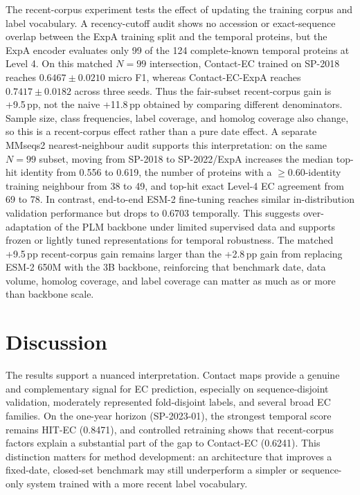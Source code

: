 \documentclass[numbered,contemporary,mediumone]{oup-authoring-template}
\begin{document}
The recent-corpus experiment tests the effect of updating the training corpus and
label vocabulary. A recency-cutoff audit shows no accession or exact-sequence
overlap between the ExpA training split and the temporal proteins, but the ExpA
encoder evaluates only 99 of the 124 complete-known temporal proteins at Level 4.
On this matched $N=99$ intersection, Contact-EC trained on SP-2018 reaches
$0.6467\pm0.0210$ micro F1, whereas Contact-EC-ExpA reaches
$0.7417\pm0.0182$ across three seeds. Thus the fair-subset recent-corpus gain is
+9.5\,pp, not the naive +11.8\,pp obtained by
comparing different denominators. Sample size, class frequencies, label
coverage, and homolog coverage also change, so this is a recent-corpus effect
rather than a pure date effect. A separate MMseqs2 nearest-neighbour audit
supports this interpretation: on the same $N=99$ subset, moving from SP-2018 to
SP-2022/ExpA increases the median top-hit identity from 0.556 to 0.619, the
number of proteins with a $\geq0.60$-identity training neighbour from 38 to 49,
and top-hit exact Level-4 EC agreement from 69 to 78. In contrast,
end-to-end ESM-2 fine-tuning reaches similar in-distribution validation performance
but drops to 0.6703 temporally. This suggests over-adaptation of the PLM backbone
under limited supervised data and supports frozen or lightly tuned representations
for temporal robustness. The matched +9.5\,pp recent-corpus gain remains larger
than the +2.8\,pp gain from replacing ESM-2 650M with the 3B backbone,
reinforcing that benchmark date, data volume, homolog coverage, and label
coverage can matter as much as or more than backbone scale.

\section{Discussion}

The results support a nuanced interpretation. Contact maps provide a genuine
and complementary signal for EC prediction, especially on sequence-disjoint
validation, moderately represented fold-disjoint labels, and several broad EC
families. On the one-year horizon (SP-2023-01), the strongest temporal score
remains HIT-EC (0.8471), and controlled retraining shows that recent-corpus
factors explain a substantial part of the gap to Contact-EC (0.6241). This
distinction matters for method development: an architecture that improves a
fixed-date, closed-set benchmark may still underperform a simpler or sequence-only
system trained with a more recent label vocabulary.
\end{document}
